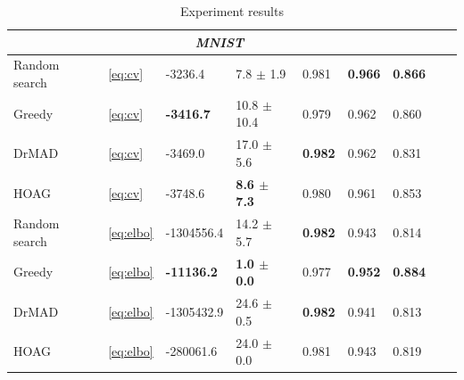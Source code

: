 \begin{table}
\begin{tabularx}{\textwidth}{ |X|X|X|X|X|X|X|X|X|}
\multicolumn{7}{|c|}{\textit{MNIST}}  \\
\hline
Random search & ~\eqref{eq:cv} & -3236.4  & 7.8 $\pm$ 1.9  &   0.981 & \bf 0.966 & \bf 0.866 \\
\hline
Greedy & ~\eqref{eq:cv} & \bf -3416.7 & 10.8 $\pm$ 10.4 & 0.979 & 0.962 & 0.860\\
\hline
DrMAD & ~\eqref{eq:cv} & -3469.0 & 17.0 $\pm$ 5.6 & \bf  0.982 & 0.962 & 0.831\\
\hline
HOAG & ~\eqref{eq:cv} & -3748.6 & \bf 8.6 $\pm$ 7.3&   0.980 &  0.961  & 0.853 \\
\hline
Random search & ~\eqref{eq:elbo} & -1304556.4 &  14.2 $\pm$ 5.7 &  \bf 0.982 & 0.943 & 0.814 \\
\hline
Greedy & ~\eqref{eq:elbo} & \bf -11136.2 & \bf 1.0 $\pm$ 0.0  &  0.977 & \bf 0.952 & \bf 0.884\\
\hline
DrMAD & ~\eqref{eq:elbo} & -1305432.9 & 24.6 $\pm$ 0.5  & \bf 0.982 & 0.941 & 0.813 \\
\hline
HOAG & ~\eqref{eq:elbo} &  -280061.6 & 24.0 $\pm$ 0.0  & 0.981 & 0.943 & 0.819\\
\hline


\hline
\end{tabularx}
\caption{Experiment results}
\label{table:table}
\end{table}


